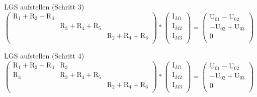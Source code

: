 \documentclass[aspectratio=169, ignorenonframetext]{beamer}
\begin{document}
\begin{frame}{LGS aufstellen (Schritt 3)}
$\left( \begin{array}{lll}
\text{R}_1+\text{R}_2+\text{R}_3 & & \\
& \text{R}_3+\text{R}_4+\text{R}_5 & \\
&&\text{R}_2 + \text{R}_4 + \text{R}_6 \\
\end{array}\right) *
\left(\begin{array}{c}
  \text{I}_{M1}\\
  \text{I}_{M2}\\
  \text{I}_{M3}\\
     \end{array} \right)
     =
\left(\begin{array}{c}
  \text{U}_{01}-\text{U}_{02}\\
  -\text{U}_{02}+\text{U}_{03}\\
  0\\
     \end{array} \right)
$
\end{frame}

\begin{frame}{LGS aufstellen (Schritt 4)}
$\left( \begin{array}{ccc}
\text{R}_1+\text{R}_2+\text{R}_3 &\text{R}_3 & \\
\text{R}_3& \text{R}_3+\text{R}_4+\text{R}_5 & \\
&&\text{R}_2 + \text{R}_4 + \text{R}_6 \\
\end{array}\right) *
\left(\begin{array}{c}
  \text{I}_{M1}\\
  \text{I}_{M2}\\
  \text{I}_{M3}\\
     \end{array} \right)
     =
\left(\begin{array}{c}
  \text{U}_{01}-\text{U}_{02}\\
  -\text{U}_{02}+\text{U}_{03}\\
  0\\
     \end{array} \right)
$
\end{frame}
\end{document}
